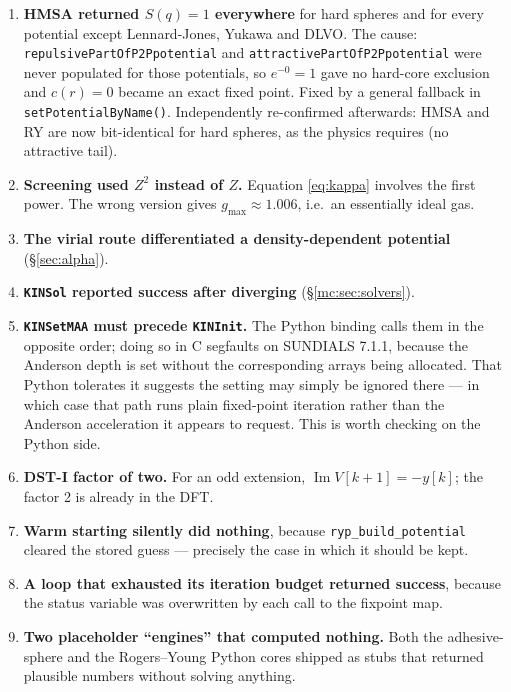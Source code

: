 \documentclass[11pt,a4paper]{article}
\newcommand{\code}[1]{\texttt{#1}}
\begin{document}
\begin{enumerate}
\item \textbf{HMSA returned $S(q)=1$ everywhere} for hard spheres and for
every potential except Lennard-Jones, Yukawa and DLVO. The cause:
\code{repulsivePartOfP2Ppotential} and
\code{attractivePartOfP2Ppotential} were never populated for those
potentials, so $e^{-0}=1$ gave no hard-core exclusion and $c(r)=0$ became an
exact fixed point. Fixed by a general fallback in
\code{setPotentialByName()}. Independently re-confirmed afterwards: HMSA and
RY are now bit-identical for hard spheres, as the physics requires (no
attractive tail).

\item \textbf{Screening used $Z^2$ instead of $Z$.} Equation
\eqref{eq:kappa} involves the first power. The wrong version gives
$g_{\max}\approx1.006$, i.e.\ an essentially ideal gas.

\item \textbf{The virial route differentiated a density-dependent
potential} (\S\ref{sec:alpha}).

\item \textbf{\code{KINSol} reported success after diverging}
(\S\ref{mc:sec:solvers}).

\item \textbf{\code{KINSetMAA} must precede \code{KINInit}.} The Python
binding calls them in the opposite order; doing so in C segfaults on SUNDIALS
7.1.1, because the Anderson depth is set without the corresponding arrays
being allocated. That Python tolerates it suggests the setting may simply be
ignored there --- in which case that path runs plain fixed-point iteration
rather than the Anderson acceleration it appears to request. This is worth
checking on the Python side.

\item \textbf{DST-I factor of two.} For an odd extension,
$\operatorname{Im}V[k+1]=-y[k]$; the factor 2 is already in the DFT.

\item \textbf{Warm starting silently did nothing}, because
\code{ryp\_build\_potential} cleared the stored guess --- precisely the case
in which it should be kept.

\item \textbf{A loop that exhausted its iteration budget returned success},
because the status variable was overwritten by each call to the fixpoint map.


\item \textbf{Two placeholder ``engines'' that computed nothing.} Both the
adhesive-sphere and the Rogers--Young Python cores shipped as stubs that
returned plausible numbers without solving anything.


\end{enumerate}
\end{document}
